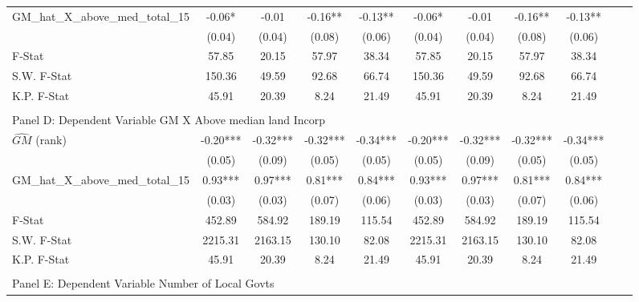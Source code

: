 \begin{table}[htbp]
\begin{threeparttable}
\begin{tabular}{l*{10}{c}}
\addlinespace
GM\_hat\_X\_above\_med\_total\_15&      -0.06*  &      -0.01   &      -0.16** &      -0.13** &      -0.06*  &      -0.01   &      -0.16** &      -0.13** \\
                &     (0.04)   &     (0.04)   &     (0.08)   &     (0.06)   &     (0.04)   &     (0.04)   &     (0.08)   &     (0.06)   \\
\midrule
F-Stat          &      57.85   &      20.15   &      57.97   &      38.34   &      57.85   &      20.15   &      57.97   &      38.34   \\
S.W. F-Stat     &     150.36   &      49.59   &      92.68   &      66.74   &     150.36   &      49.59   &      92.68   &      66.74   \\
K.P. F-Stat     &      45.91   &      20.39   &       8.24   &      21.49   &      45.91   &      20.39   &       8.24   &      21.49   \\
\cmidrule[\heavyrulewidth](lr){1-9} \\ \cmidrule[\heavyrulewidth](lr){1-9}
\multicolumn{8}{l}{Panel D: Dependent Variable GM X Above median land Incorp}\\
\cmidrule(lr){1-9}
$\hat{GM}$ (rank)&      -0.20***&      -0.32***&      -0.32***&      -0.34***&      -0.20***&      -0.32***&      -0.32***&      -0.34***\\
                &     (0.05)   &     (0.09)   &     (0.05)   &     (0.05)   &     (0.05)   &     (0.09)   &     (0.05)   &     (0.05)   \\
\addlinespace
GM\_hat\_X\_above\_med\_total\_15&       0.93***&       0.97***&       0.81***&       0.84***&       0.93***&       0.97***&       0.81***&       0.84***\\
                &     (0.03)   &     (0.03)   &     (0.07)   &     (0.06)   &     (0.03)   &     (0.03)   &     (0.07)   &     (0.06)   \\
\midrule
F-Stat          &     452.89   &     584.92   &     189.19   &     115.54   &     452.89   &     584.92   &     189.19   &     115.54   \\
S.W. F-Stat     &    2215.31   &    2163.15   &     130.10   &      82.08   &    2215.31   &    2163.15   &     130.10   &      82.08   \\
K.P. F-Stat     &      45.91   &      20.39   &       8.24   &      21.49   &      45.91   &      20.39   &       8.24   &      21.49   \\
\cmidrule[\heavyrulewidth](lr){1-9} \\ \cmidrule[\heavyrulewidth](lr){1-9}
\multicolumn{8}{l}{Panel E: Dependent Variable Number of Local Govts}\\

\end{tabular}
\end{threeparttable}
\end{table}
